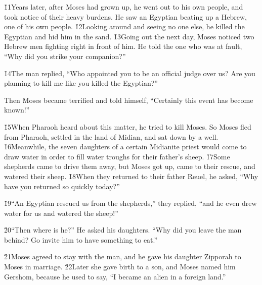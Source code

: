 \v{11}Years later, after Moses had grown up, he went out to his own people, and took notice of their heavy burdens. He saw an Egyptian beating up a Hebrew, one of his own people. \v{12}Looking around and seeing no one else, he killed the Egyptian and hid him in the sand. \v{13}Going out the next day, Moses noticed two Hebrew men fighting right in front of him. He told the one who was at fault, ``Why did you strike your companion?''

\v{14}The man replied, ``Who appointed you to be an official judge over us? Are you planning to kill me like you killed the Egyptian?''

Then Moses became terrified and told himself, ``Certainly this event has become known!''

\v{15}When Pharaoh heard about this matter, he tried to kill Moses. So Moses fled from Pharaoh, settled in the land of Midian, and sat down by a well. \v{16}Meanwhile, the seven daughters of a certain Midianite priest would come to draw water in order to fill water troughs for their father's sheep. \v{17}Some shepherds came to drive them away, but Moses got up, came to their rescue, and watered their sheep. \v{18}When they returned to their father Reuel, he asked, ``Why have you returned so quickly today?''

\v{19}``An Egyptian rescued us from the shepherds,'' they replied, ``and he even drew water for us and watered the sheep!''

\v{20}``Then where is he?'' He asked his daughters. ``Why did you leave the man behind? Go invite him to have something to eat.''

\v{21}Moses agreed to stay with the man, and he gave his daughter Zipporah to Moses in marriage. \v{22}Later she gave birth to a son, and Moses named him Gershom, because he used to say, ``I became an alien in a foreign land.''

